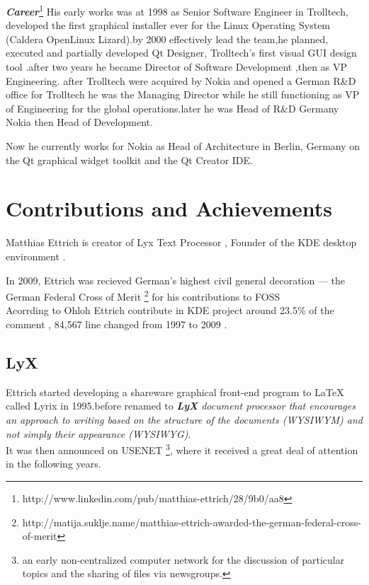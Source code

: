 \documentclass[DIV=calc, paper=a4, fontsize=11pt]{scrartcl}
\begin{document}
{\Large\emph{\textbf{Career}}}\footnote{http://www.linkedin.com/pub/matthias-ettrich/28/9b0/aa8}
His early works was at 1998  as Senior Software Engineer in Trolltech, developed the first graphical installer ever for the Linux Operating System (Caldera OpenLinux Lizard).by 2000 effectively lead the team,he planned, executed and partially developed Qt Designer, Trolltech's first visual GUI design tool .after two years he became Director of Software Development ,then as VP Engineering.
after Trolltech were acquired by Nokia and opened a German R\&D office for Trolltech he was the Managing Director while he still functioning as VP of Engineering for the global operations.later he was Head of R\&D Germany Nokia then Head of Development.

Now he currently  works for Nokia as Head of Architecture in Berlin, Germany on the Qt graphical widget toolkit and the Qt Creator IDE. 


\section{ Contributions and Achievements}

Matthias Ettrich is creator of Lyx Text Processor , Founder of the KDE desktop environment .
 
 In 2009, Ettrich was  recieved German’s highest civil general decoration — the German Federal Cross of Merit \footnote {http://matija.suklje.name/matthias-ettrich-awarded-the-german-federal-cross-of-merit} for his contributions to FOSS \\
 Acorrding to Ohloh Ettrich contribute in KDE project around 23.5\% of the comment , 84,567 line changed from 1997 to 2009 .
\subsection{LyX}

Ettrich started developing a shareware graphical  front-end  program to LaTeX called Lyrix in 1995.before renamed to  \emph{  \textbf{LyX}  document processor that encourages an approach to writing based on the structure of the documents (WYSIWYM) and not simply their appearance (WYSIWYG)}.\\
 It was then announced on USENET \footnote {an early non-centralized computer network for the discussion of particular topics and the sharing of files via newsgroups.}, where it received a great deal of attention in the following years.
\end{document}
